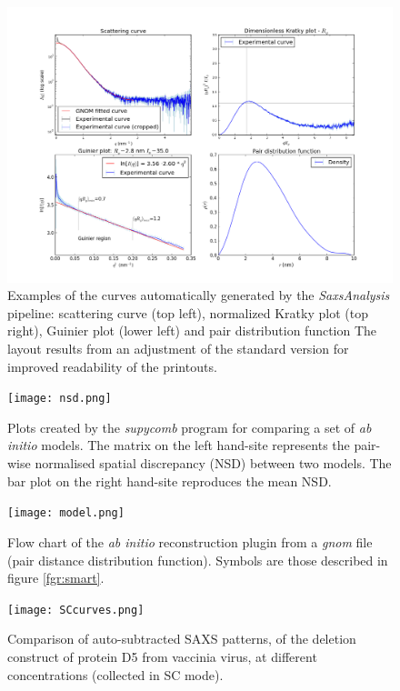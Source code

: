 \documentclass[preprint,pdf]{iucr}              %
\begin{document}
\begin{figure}
\centering
\includegraphics[width=18cm]{autoplot.png}
\caption{Examples of the curves automatically generated by the
\textit{SaxsAnalysis} pipeline: scattering curve (top left), normalized Kratky
plot (top right), Guinier plot (lower left) and pair distribution function
The layout results from an adjustment of the standard version for
improved readability of the printouts.}
\label{plots}
\end{figure}

\begin{figure}
\centering
\texttt{[image: nsd.png]}
\caption{Plots created by the \textit{supycomb} program for comparing a set
of \textit{ab initio} models.
The matrix on the left hand-site represents the pair-wise normalised spatial
discrepancy (NSD) between two models.
The bar plot on the right hand-site reproduces the mean NSD.}
\label{fgr:nsd}
\end{figure}

\begin{figure}
\centering
\texttt{[image: model.png]}
\caption{Flow chart of the \textit{ab initio} reconstruction plugin from a
\textit{gnom} file (pair distance distribution function).
Symbols are those described in figure \ref{fgr:smart}.}\label{fgr:analysis}
\label{fgr:modelling}
\end{figure}

\begin{figure}
\centering
\texttt{[image: SCcurves.png]}
\caption{Comparison of auto-subtracted SAXS patterns, of the deletion
construct of protein D5 from vaccinia virus, at different concentrations
(collected in SC mode).}
\label{fgr:SCcurves}
\end{figure}
\end{document}
